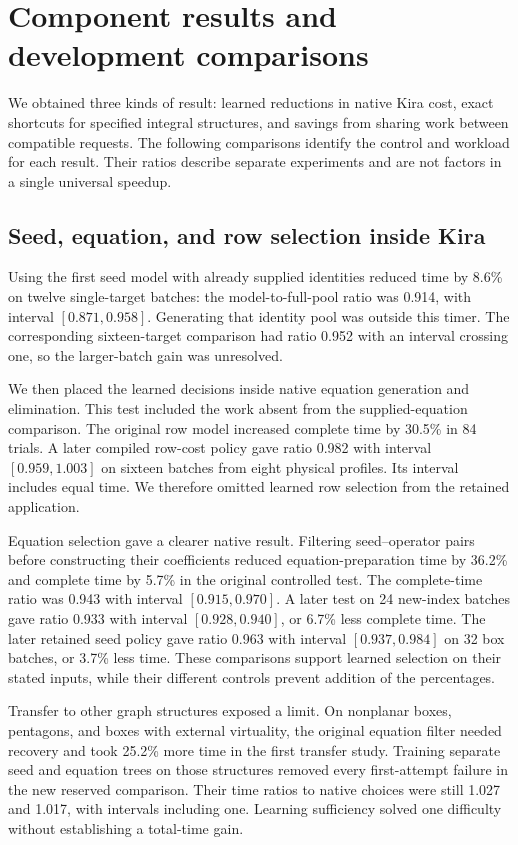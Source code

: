 \section{Component results and development comparisons}
\label{sec:project-results}
We obtained three kinds of result: learned reductions in native Kira cost, exact shortcuts for specified integral structures, and savings from sharing work between compatible requests. The following comparisons identify the control and workload for each result. Their ratios describe separate experiments and are not factors in a single universal speedup.

\subsection{Seed, equation, and row selection inside Kira}
Using the first seed model with already supplied identities reduced time by 8.6\% on twelve single-target batches: the model-to-full-pool ratio was 0.914, with interval $[0.871,0.958]$. Generating that identity pool was outside this timer. The corresponding sixteen-target comparison had ratio 0.952 with an interval crossing one, so the larger-batch gain was unresolved.

We then placed the learned decisions inside native equation generation and elimination. This test included the work absent from the supplied-equation comparison. The original row model increased complete time by 30.5\% in 84 trials. A later compiled row-cost policy gave ratio 0.982 with interval $[0.959,1.003]$ on sixteen batches from eight physical profiles. Its interval includes equal time. We therefore omitted learned row selection from the retained application.

Equation selection gave a clearer native result. Filtering seed--operator pairs before constructing their coefficients reduced equation-preparation time by 36.2\% and complete time by 5.7\% in the original controlled test. The complete-time ratio was 0.943 with interval $[0.915,0.970]$. A later test on 24 new-index batches gave ratio 0.933 with interval $[0.928,0.940]$, or 6.7\% less complete time. The later retained seed policy gave ratio 0.963 with interval $[0.937,0.984]$ on 32 box batches, or 3.7\% less time. These comparisons support learned selection on their stated inputs, while their different controls prevent addition of the percentages.

Transfer to other graph structures exposed a limit. On nonplanar boxes, pentagons, and boxes with external virtuality, the original equation filter needed recovery and took 25.2\% more time in the first transfer study. Training separate seed and equation trees on those structures removed every first-attempt failure in the new reserved comparison. Their time ratios to native choices were still 1.027 and 1.017, with intervals including one. Learning sufficiency solved one difficulty without establishing a total-time gain.

